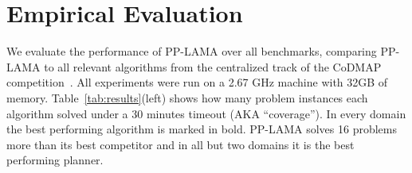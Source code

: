 \documentclass[letterpaper]{article}
\theoremstyle{definition}
\begin{document}


\section{Empirical Evaluation}
We evaluate the performance of PP-LAMA over all benchmarks, comparing PP-LAMA to all relevant algorithms from the centralized track of the CoDMAP competition~\cite{vstolba2015competition}. All experiments were run on a 2.67 GHz machine with 32GB of memory. %
Table~\ref{tab:results}(left) shows how many problem instances each algorithm solved under a 30 minutes timeout (AKA ``coverage''). In every domain the best performing algorithm is marked in bold. PP-LAMA solves 16 problems more than its best competitor and in all but two domains it is the best performing planner.
\end{document}
